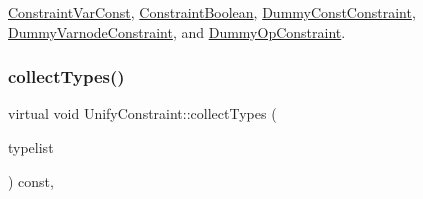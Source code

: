 \mbox{\hyperlink{class_constraint_var_const_a5cb644447fed3576d92e25d3349eb387}{Constraint\+Var\+Const}}, \mbox{\hyperlink{class_constraint_boolean_a3b258aaef6abed8c36455b562016cfbc}{Constraint\+Boolean}}, \mbox{\hyperlink{class_dummy_const_constraint_acf3f66f2d189379f19ee11c14278ab3d}{Dummy\+Const\+Constraint}}, \mbox{\hyperlink{class_dummy_varnode_constraint_a8a5c0d0f00ab7343a19985465e59dc4b}{Dummy\+Varnode\+Constraint}}, and \mbox{\hyperlink{class_dummy_op_constraint_a86d183fe63aec86dc883c626287f32ed}{Dummy\+Op\+Constraint}}.

\mbox{\label{class_unify_constraint_acb83b6bea3b21e13054e72ac9cfaba0f}} 
\subsubsection{\texorpdfstring{collectTypes()}{collectTypes()}}
{\footnotesize\ttfamily virtual void Unify\+Constraint\+::collect\+Types (\begin{DoxyParamCaption}\item[{vector$<$ \mbox{\hyperlink{class_unify_datatype}{Unify\+Datatype}} $>$ \&}]{typelist }\end{DoxyParamCaption}) const\hspace{0.3cm}{\ttfamily [inline]}, {\ttfamily [virtual]}}



